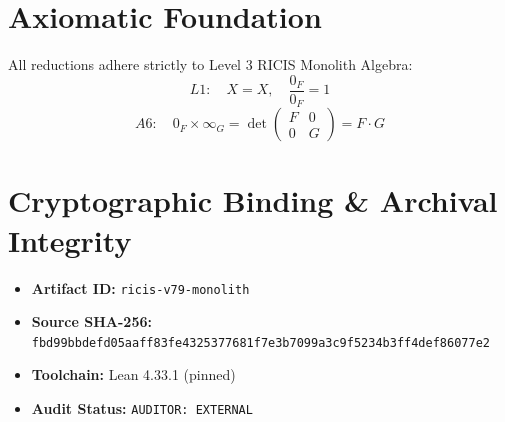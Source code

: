 \documentclass[11pt,a4paper]{article}
\begin{document}
\section{Axiomatic Foundation}
All reductions adhere strictly to Level 3 RICIS Monolith Algebra:
\begin{equation}
L1: \quad X = X, \quad \frac{0_F}{0_F} = 1
\end{equation}
\begin{equation}
A6: \quad 0_F \times \infty_G = \det\begin{pmatrix} F & 0 \\ 0 & G \end{pmatrix} = F \cdot G
\end{equation}

\section{Cryptographic Binding & Archival Integrity}
\begin{itemize}
  \item \textbf{Artifact ID:} \texttt{ricis-v79-monolith}
  \item \textbf{Source SHA-256:} \texttt{fbd99bbdefd05aaff83fe4325377681f7e3b7099a3c9f5234b3ff4def86077e2}
  \item \textbf{Toolchain:} Lean 4.33.1 (pinned)
  \item \textbf{Audit Status:} \texttt{AUDITOR: EXTERNAL}
\end{itemize}
\end{document}
